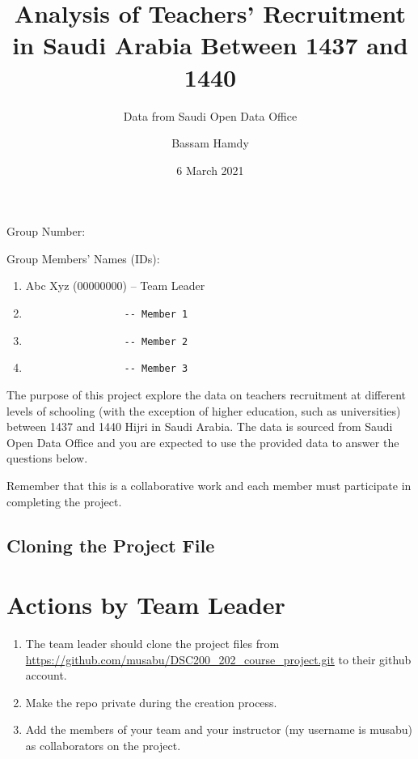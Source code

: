 \documentclass[
]{article}
\title{Analysis of Teachers' Recruitment in Saudi Arabia Between 1437
and 1440}
\subtitle{Data from Saudi Open Data Office}
\author{Bassam Hamdy}
\date{6 March 2021}
\begin{document}
\maketitle

Group Number:

Group Members' Names (IDs):

\begin{enumerate}
\def\labelenumi{\arabic{enumi}.}
\item
  Abc Xyz (00000000) -- Team Leader
\item
\begin{verbatim}
                 -- Member 1
\end{verbatim}
\item
\begin{verbatim}
                 -- Member 2
\end{verbatim}
\item
\begin{verbatim}
                 -- Member 3
\end{verbatim}
\end{enumerate}

The purpose of this project explore the data on teachers recruitment at
different levels of schooling (with the exception of higher education,
such as universities) between 1437 and 1440 Hijri in Saudi Arabia. The
data is sourced from Saudi Open Data Office and you are expected to use
the provided data to answer the questions below.

Remember that this is a collaborative work and each member must
participate in completing the project.

\hypertarget{cloning-the-project-file}{%
\subsection{Cloning the Project File}\label{cloning-the-project-file}}

\hypertarget{actions-by-team-leader}{%
\section{Actions by Team Leader}\label{actions-by-team-leader}}

\begin{enumerate}
\def\labelenumi{\arabic{enumi}.}
\item
  The team leader should clone the project files from
  \url{https://github.com/musabu/DSC200_202_course_project.git} to their
  github account.
\item
  Make the repo private during the creation process.
\item
  Add the members of your team and your instructor (my username is
  musabu) as collaborators on the project.
\end{enumerate}
\end{document}
